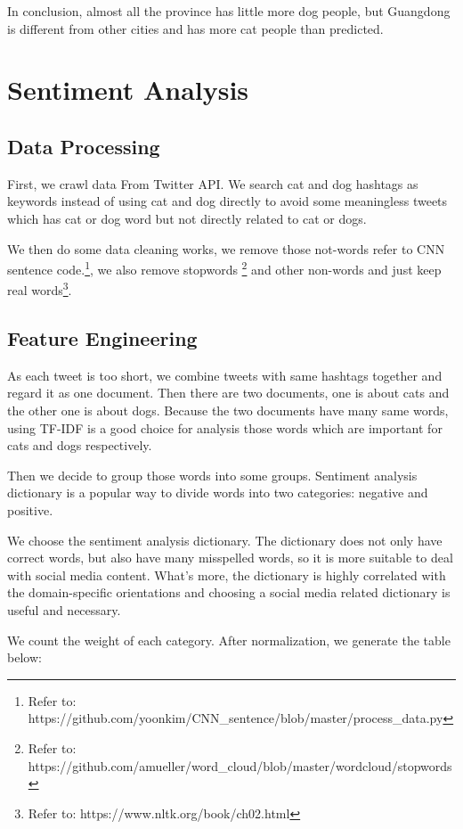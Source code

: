\documentclass[12pt]{article}
\begin{document}
In conclusion, almost all the province has little more dog people, but Guangdong is different from other cities and has more cat people than predicted.

\section{Sentiment Analysis}

\subsection{Data Processing}

First, we crawl data From Twitter API. We search cat and dog hashtags as keywords instead of using cat and dog directly to avoid some meaningless tweets which has cat or dog word but not directly related to cat or dogs.

We then do some data cleaning works, we remove those not-words refer to CNN sentence code.\footnote{Refer to: https://github.com/yoonkim/CNN\_sentence/blob/master/process\_data.py}, we also remove stopwords \footnote{Refer to: https://github.com/amueller/word\_cloud/blob/master/wordcloud/stopwords} and other non-words and just keep real words\footnote{Refer to: https://www.nltk.org/book/ch02.html}.

\subsection{Feature Engineering}
As each tweet is too short, we combine tweets with same hashtags together and regard it as one document. Then there are two documents, one is about cats and the other one is about dogs. Because the two documents have many same words, using TF-IDF is a good choice for analysis those words which are important for cats and dogs respectively.

Then we decide to group those words into some groups. Sentiment analysis dictionary is a popular way to divide words into two categories: negative and positive.

We choose the sentiment analysis dictionary\cite{hu2004mining}. The dictionary does not only have correct words, but also have many misspelled words, so it is more suitable to deal with social media content. What's more, the dictionary is highly correlated with the domain-specific orientations\cite{liu2010sentiment} and choosing a social media related dictionary is useful and necessary.

We count the weight of each category. After normalization, we generate the table below:
\end{document}

